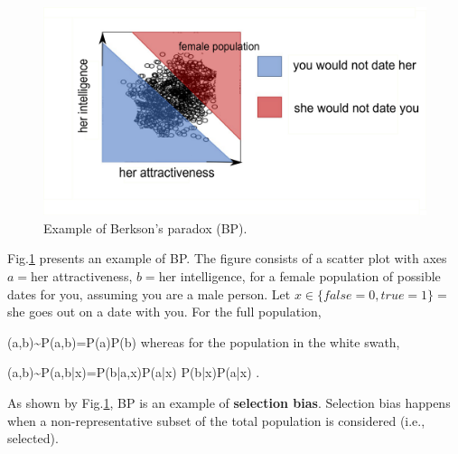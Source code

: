 \begin{figure}[h!]
\centering
\includegraphics[width=5in]
{berkson/berkson.png}
\caption{
Example
of Berkson's paradox (BP).} 
\label{fig-berkson}
\end{figure}


Fig.\ref{fig-berkson}
presents an example
of BP. The
figure consists of
a scatter plot
with axes $a=$her attractiveness,
$b=$her intelligence, 
for a female  population of 
possible dates for you,
assuming you are a male person.
Let $x\in\{false=0, true=1\}=$
she goes out on a date with you.
For the full population,

\beq
(a,b)\sim P(a,b)=P(a)P(b)
\eeq
whereas for the population
in the white swath,

\beq
(a,b)\sim P(a,b|x)=P(b|a,x)P(a|x)\neq
P(b|x)P(a|x)
\;.
\eeq

As shown by
Fig.\ref{fig-berkson},
 BP is an example of {\bf selection bias}.
Selection bias happens when
a non-representative
subset of the total population
is considered (i.e., selected).


